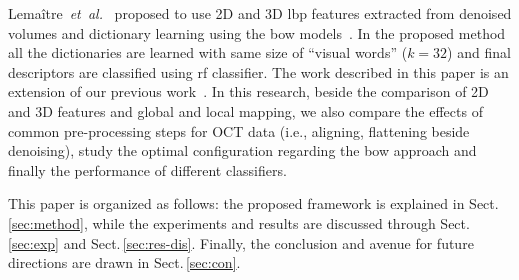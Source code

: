 Lema\^{i}tre~\emph{et~al.}~\cite{Lemaintre2015miccaiOCT} proposed to use 2D and 3D \ac{lbp} features extracted from denoised volumes and dictionary learning using the \ac{bow} models~\cite{Sivic2003}.
In the proposed method all the dictionaries are learned with same size of ``visual words'' ($k = 32$) and final descriptors are classified using \ac{rf} classifier.
The work described in this paper is an extension of our previous work~\cite{Lemaintre2015miccaiOCT}.
In this research, beside the comparison of 2D and 3D features and global and local mapping, we also compare the effects of common pre-processing steps for OCT data (i.e., aligning, flattening beside denoising), study the optimal configuration regarding the \ac{bow} approach and finally the performance of different classifiers.
 
 
This paper is organized as follows: the proposed framework is explained in Sect.\,\ref{sec:method}, while the experiments and results are discussed through Sect.\,\ref{sec:exp} and Sect.\,\ref{sec:res-dis}.
Finally, the conclusion and avenue for future directions are drawn in Sect.\,\ref{sec:con}.


